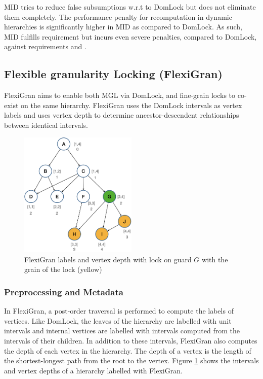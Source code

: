 
MID tries to reduce false subsumptions w.r.t to DomLock but does not eliminate them completely. The performance penalty for recomputation in dynamic hierarchies is significantly higher in MID as compared to DomLock. As such, MID fulfills requirement \Rb but incurs even severe penalties, compared to DomLock, against requirements \Rc and \Rd.

\subsection{Flexible granularity Locking (FlexiGran)}

FlexiGran \cite{FlexiGran2024} aims to enable both MGL via DomLock, and fine-grain locks to co-exist on the same hierarchy. 
FlexiGran uses the DomLock intervals  as vertex labels and uses vertex depth to determine ancestor-descendent relationships between identical intervals.

\begin{figure}
    \centering
    \captionsetup{justification=centering}
    \includegraphics[width=0.5\textwidth]{figures/flexigran_example_with_lock.png}
    \caption{FlexiGran labels and vertex depth with lock on guard $G$ with the grain of the lock (yellow)}
    \label{fig:flexigran_example_locked}
\end{figure}

\subsubsection{Preprocessing and Metadata}

In FlexiGran, a post-order traversal is performed to compute the labels of vertices. Like DomLock, the leaves of the hierarchy are labelled with unit intervals and internal vertices are labelled with intervals computed from the intervals of their children. In addition to these intervals, FlexiGran also computes the depth of each vertex in the hierarchy. The depth of a vertex is the length of the shortest-longest path from the root to the vertex. Figure \ref{fig:flexigran_example_locked} shows the intervals and vertex depths of a hierarchy labelled with FlexiGran.

